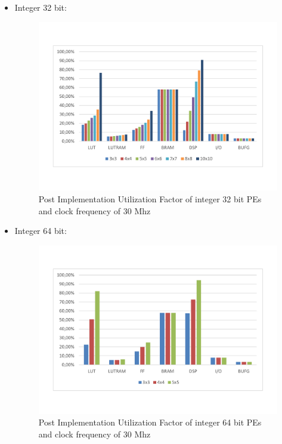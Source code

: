 \begin{itemize}
\begin{figure}[!htbp]
\label{fig:ut16bit}
\end{figure}
\newpage
\item Integer 32 bit:
\begin{figure}[!htbp]
\centering
\captionsetup{justification=centering}
\includegraphics[scale=0.35,angle=0]{./figure/graphs/utilization_factor_30mhz_int32.pdf}
\caption{Post Implementation Utilization Factor of integer 32 bit PEs and clock frequency of 30 Mhz}
\label{fig:ut32bit}
\end{figure}
\item Integer 64 bit:
\begin{figure}[!htbp]
\centering
\captionsetup{justification=centering}
\includegraphics[scale=0.35,angle=0]{./figure/graphs/utilization_factor_30mhz_int64.pdf}
\caption{Post Implementation Utilization Factor of integer 64 bit PEs and clock frequency of 30 Mhz}

\end{figure}
\end{itemize}
